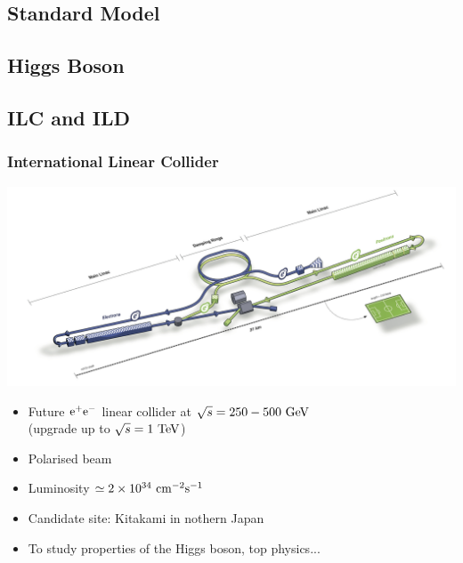 \documentclass{beamer}
\begin{document}
    \subsection{Standard Model}
    \subsection{Higgs Boson}
    \subsection{ILC and ILD}

  \begin{frame}
    \frametitle{International Linear Collider}

    \vspace{-0.3cm}
    \begin{center}
      \includegraphics[width = 9 cm]{Pictures/ILC.png}
    \end{center}

    \vspace{-0.3cm}
    \begin{itemize}
      \item Future $\rm{e}^+\rm{e}^-$ linear collider at $\sqrt{s} = 250 - 500~\rm{GeV}$ \\ (upgrade up to $\sqrt{s} = 1~\rm{TeV}$)
      \item Polarised beam
      \item Luminosity $\simeq 2 \times 10^{34}~\rm{cm}^{-2}\rm{s}^{-1}$
      \item Candidate site: Kitakami in nothern Japan
      \item To study properties of the Higgs boson, top physics...
    \end{itemize}
  \end{frame}

\end{document}
